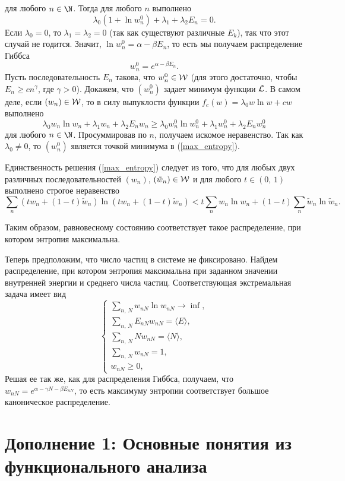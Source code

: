 \documentclass[a4paper
]{article}
\begin{document}
для любого $n\in \N$. Тогда для любого $n$ выполнено
$$\lambda_0(1+\ln w_n^0)+\lambda_1+ \lambda_2E_n=0.$$ Если
$\lambda_0=0$, то $\lambda_1=\lambda_2=0$ (так как существуют
различные $E_k$), так что этот случай не годится. Значит, $\ln
w_n^0=\alpha-\beta E_n$, то есть мы получаем распределение Гиббса
$$w_n^0=e^{\alpha-\beta E_n}.$$ Пусть последовательность $E_n$
такова, что $w_n^0 \in {\cal W}$ (для этого достаточно, чтобы
$E_n\ge cn^{\gamma}$, где $\gamma>0$). Докажем, что $(w_n^0)$
задает минимум функции ${\cal L}$. В самом деле, если $(w_n)\in {\cal W}$,
то в силу выпуклости функции $f_c(w)=\lambda _0w\ln w+cw$ выполнено
$$\lambda_0w_n\ln w_n +\lambda_1w_n+\lambda_2E_nw_n\ge \lambda_0w_n^0\ln
w_n^0+\lambda_1w_n^0+\lambda_2E_nw_n^0$$ для любого $n\in \N$.
Просуммировав по $n$, получаем искомое неравенство. Так как
$\lambda_0\ne 0$, то $(w_n^0)$ является точкой минимума в
(\ref{max_entropy}). \par
Единственность решения (\ref{max_entropy}) следует из того, что
для любых двух различных последовательностей $(w_n)$, $(\tilde w_n)
\in {\cal W}$ и для любого $t\in (0, \, 1)$ выполнено строгое
неравенство $$\sum \limits _n (tw_n+(1-t)\tilde w_n)\ln (tw_n+(1-t)\tilde
w_n)<t \sum \limits_n w_n\ln w_n+(1-t)\sum \limits_n \tilde w_n\ln \tilde
w_n.$$ \par
Таким образом, равновесному состоянию
соответствует такое распределение, при котором энтропия
максимальна. \par Теперь предположим, что число частиц в системе
не фиксировано. Найдем распределение, при котором энтропия
максимальна при заданном значении внутренней энергии и среднего
числа частиц. Соответствующая экстремальная задача имеет вид
$$\left\{ \begin{array}{l} \sum \limits_{n, \, N}w_{nN}\ln w_{nN}
\rightarrow \inf, \\ \sum \limits _{n, \, N}E_{nN}w_{nN}=\langle E\rangle,
\\ \sum \limits_{n, \, N}Nw_{nN}=\langle N\rangle, \\ \sum \limits_{n,
\, N}w_{nN}=1, \\ w_{nN}\ge 0,\end{array}\right.$$
Решая ее так же, как для распределения Гиббса, получаем, что
$w_{nN}=e^{\alpha-\gamma N-\beta E_{nN}}$, то есть максимуму энтропии
соответствует большое каноническое распределение.
\section{Дополнение 1: Основные понятия из функционального анализа}
\end{document}
